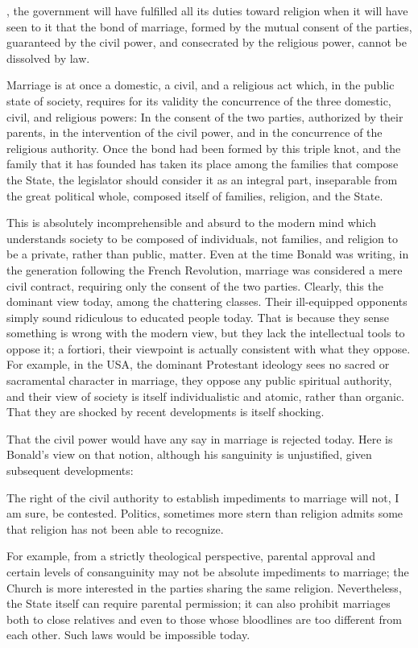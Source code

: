 \begin{quotex}
, the government will have fulfilled all its duties toward religion when it will have seen to it that the bond of marriage, formed by the mutual consent of the parties, guaranteed by the civil power, and consecrated by the religious power, cannot be dissolved by law.

Marriage is at once a domestic, a civil, and a religious act which, in the public state of society, requires for its validity the concurrence of the three domestic, civil, and religious powers: In the consent of the two parties, authorized by their parents, in the intervention of the civil power, and in the concurrence of the religious authority. Once the bond had been formed by this triple knot, and the family that it has founded has taken its place among the families that compose the State, the legislator should consider it as an integral part, inseparable from the great political whole, composed itself of families, religion, and the State. 

\end{quotex}
This is absolutely incomprehensible and absurd to the modern mind which understands society to be composed of individuals, not families, and religion to be a private, rather than public, matter. Even at the time Bonald was writing, in the generation following the French Revolution, marriage was considered a mere civil contract, requiring only the consent of the two parties. Clearly, this the dominant view today, among the chattering classes. Their ill-equipped opponents simply sound ridiculous to educated people today. That is because they sense something is wrong with the modern view, but they lack the intellectual tools to oppose it; a fortiori, their viewpoint is actually consistent with what they oppose. For example, in the USA, the dominant Protestant ideology sees no sacred or sacramental character in marriage, they oppose any public spiritual authority, and their view of society is itself individualistic and atomic, rather than organic. That they are shocked by recent developments is itself shocking.

That the civil power would have any say in marriage is rejected today. Here is Bonald's view on that notion, although his sanguinity is unjustified, given subsequent developments:

\begin{quotex}
The right of the civil authority to establish impediments to marriage will not, I am sure, be contested. Politics, sometimes more stern than religion admits some that religion has not been able to recognize. 

\end{quotex}
For example, from a strictly theological perspective, parental approval and certain levels of consanguinity may not be absolute impediments to marriage; the Church is more interested in the parties sharing the same religion. Nevertheless, the State itself can require parental permission; it can also prohibit marriages both to close relatives and even to those whose bloodlines are too different from each other. Such laws would be impossible today.

